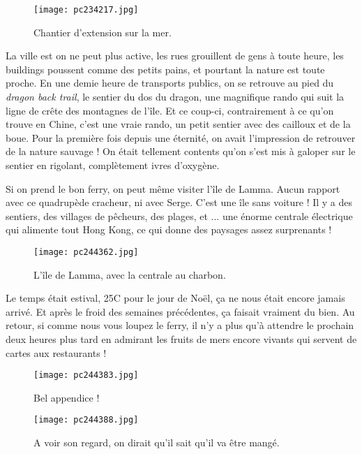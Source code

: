 \documentclass{book}
\begin{document}
\begin{figure}[h]
\centering
\texttt{[image: pc234217.jpg]}
\caption*{Chantier d'extension sur la mer.}
\end{figure}

La ville est on ne peut plus active, les rues grouillent de gens à toute heure, les buildings poussent comme des petits pains, et pourtant la nature est toute proche. En une demie heure de transports publics, on se retrouve au pied du \emph{dragon back trail}, le sentier du dos du dragon, une magnifique rando qui suit la ligne de crête des montagnes de l'île. Et ce coup-ci, contrairement à ce qu'on trouve en Chine, c'est une vraie rando, un petit sentier avec des cailloux et de la boue. Pour la première fois depuis une éternité, on avait l'impression de retrouver de la nature sauvage ! On était tellement contents qu'on s'est mis à galoper sur le sentier en rigolant, complètement ivres d'oxygène.

Si on prend le bon ferry, on peut même visiter l'île de Lamma. Aucun rapport avec ce quadrupède cracheur, ni avec Serge. C'est une île sans voiture ! Il y a des sentiers, des villages de pêcheurs, des plages, et ... une énorme centrale électrique qui alimente tout Hong Kong, ce qui donne des paysages assez surprenants !


\begin{figure}[h]
\centering
\texttt{[image: pc244362.jpg]}
\caption*{L'île de Lamma, avec la centrale au charbon.}
\end{figure}

Le temps était estival, 25\textdegree C pour le jour de Noël, ça ne nous était encore jamais arrivé. Et après le froid des semaines précédentes, ça faisait vraiment du bien. Au retour, si comme nous vous loupez le ferry, il n'y a plus qu'à attendre le prochain deux heures plus tard en admirant les fruits de mers encore vivants qui servent de cartes aux restaurants !


\begin{figure}[h]
\centering
\texttt{[image: pc244383.jpg]}
\caption*{Bel appendice !}
\end{figure}


\begin{figure}[h]
\centering
\texttt{[image: pc244388.jpg]}
\caption*{A voir son regard, on dirait qu'il sait qu'il va être mangé.}
\end{figure}
\end{document}
